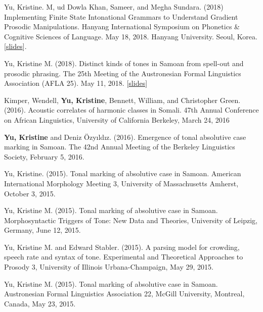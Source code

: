 \documentclass[10pt]{article}
\begin{document}
\begin{bibenum}

\item Yu, Kristine. M, ud Dowla Khan, Sameer, and Megha Sundara. (2018) Implementing Finite State Intonational Grammars to Understand Gradient Prosodic Manipulations. Hanyang International Symposium on Phonetics \& Cognitive Sciences of Language. May 18, 2018. Hanyang University. Seoul, Korea. [\href{https://speakerdeck.com/krisyu/implementing-finite-state-intonational-grammars-to-understand-gradient-prosodic-manipulations-in-infant-directed-speech}{slides}].
  
 \item Yu, Kristine M. (2018). Distinct kinds of tones in Samoan from spell-out and prosodic phrasing. The 25th Meeting of the Austronesian Formal Linguistics Association (AFLA 25). May 11, 2018. [\href{https://speakerdeck.com/krisyu/distinct-kinds-of- tones-in-samoan-from-spell-out-and-prosodic- phrasing}{slides}] 
  
  \item Kimper, Wendell, \textbf{Yu, Kristine}, Bennett, William, and Christopher Green. (2016). Acoustic correlates of harmonic classes in
    Somali. 47th Annual Conference on African Linguistics, University
    of California Berkeley, March 24, 2016

  \item \textbf{Yu, Kristine} and Deniz \"{O}zy\i{}ld\i{}z. (2016). Emergence of tonal absolutive case
    marking in Samoan. The 42nd Annual Meeting of the Berkeley
    Linguistics Society, February 5, 2016.

  \item Yu, Kristine. (2015). Tonal marking of absolutive case in
    Samoan. American International Morphology Meeting 3, University of
    Massachusetts Amherst, October 3, 2015.

  \item Yu, Kristine M. (2015). Tonal marking of absolutive case in
    Samoan. Morphosyntactic Triggers of Tone:
New Data and Theories, University of Leipzig, Germany, June 12, 2015.  

  \item Yu, Kristine M. and Edward Stabler. (2015). A parsing model for crowding, speech rate and syntax of tone. Experimental and Theoretical Approaches to Prosody 3,
    University of Illinois Urbana-Champaign, May 29, 2015.

  \item Yu, Kristine M. (2015). Tonal marking of absolutive case in
    Samoan. Austronesian Formal Linguistics Association 22, McGill
    University, Montreal, Canada, May 23, 2015.  


\end{bibenum}
\end{document}

